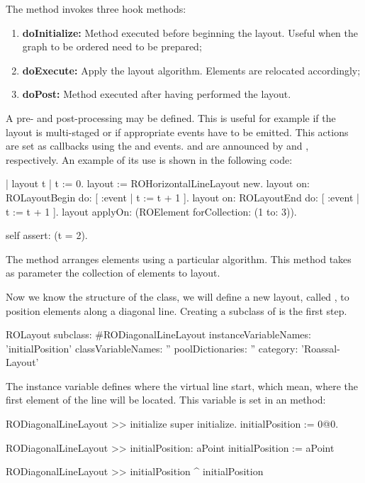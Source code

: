 \documentclass[a4paper,10pt,twoside]{book}
\begin{document}
The  method invokes three hook methods:

\begin{enumerate}
\item \textbf{doInitialize:} Method executed before beginning the layout. Useful when the graph to be ordered need to be prepared;
\item \textbf{doExecute:} Apply the layout algorithm. Elements are relocated accordingly;
\item \textbf{doPost:} Method executed after having performed the layout. 
\end{enumerate}

A pre- and post-processing may be defined. This is useful for example if the layout is multi-staged or if appropriate events have to be emitted. This actions are set as callbacks using the  and  events.
 and  are announced by  and , respectively. An example of its use is shown in the following code:

\begin{code}{}
| layout t |
t := 0.
layout := ROHorizontalLineLayout new.
layout on: ROLayoutBegin do: [ :event | t := t + 1 ].
layout on: ROLayoutEnd do: [ :event | t := t + 1 ].
layout applyOn: (ROElement forCollection: (1 to: 3)).

self assert: (t = 2).
\end{code}

The  method arranges elements using a particular algorithm. This method takes as parameter the collection of elements to layout.

Now we know the structure of the  class, we will define a new layout, called , to position elements along a diagonal line.
Creating a subclass of  is the first step. 

\begin{code}{}
ROLayout subclass: #RODiagonalLineLayout
	instanceVariableNames: 'initialPosition'
	classVariableNames: ''
	poolDictionaries: ''
	category: 'Roassal-Layout'
\end{code}

The instance variable  defines where the virtual line start, which mean, where the first element of the line will be located. This variable is set in an  method:

\begin{code}{}
RODiagonalLineLayout >> initialize
	super initialize.
	initialPosition := 0@0.
	
RODiagonalLineLayout >> initialPosition: aPoint
	initialPosition := aPoint
	
RODiagonalLineLayout >> initialPosition
	^ initialPosition
\end{code}
\end{document}
